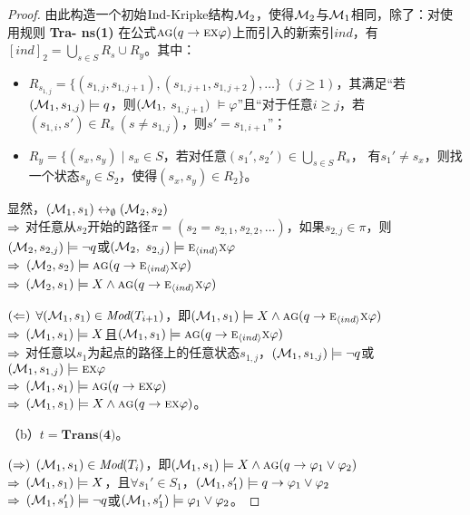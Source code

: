 \begin{proof}
	由此构造一个初始$\textrm{Ind}$-Kripke结构${\cal M}_2$，使得${\cal M}_2$与${\cal M}_1$相同，除了：对使用规则 \textbf{Tra- ns(1)} 在公式$\textsc{a}\textsc{g}(q \rightarrow \textsc{e} \textsc{x} \varphi)$上而引入的新索引$ind$，有$[ind]_2=\bigcup_{s\in S} R_s \cup R_y$。其中：
	\begin{itemize}
		\item $R_{s_{1,j}}=\{(s_{1,j}, s_{1,j+1}), (s_{1,j+1}, s_{1,j+2}),\dots\}$ $(j\geq 1)$，其满足“若$({\cal M}_1,s_{1,j}) \models q$，则$({\cal M}_1,$ $s_{1,j+1})$ $\models \varphi$”且“对于任意$i\geq j$，若$(s_{1,i}, s') \in R_s\ (s \not= s_{1,j})$，则$s'=s_{1,i+1}$”；
		\item $R_y=\{(s_x,s_y)\mid s_x\in S$，若对任意$(s_1',s_2') \in \bigcup_{s\in S} R_s$， 有$s_1'\not= s_x$，则找一个状态$s_y\in S_2$，使得$(s_x,s_y)\in R_2\}$。
	\end{itemize}
	
	显然，$({\cal M}_1,s_1) \leftrightarrow_{\emptyset} ({\cal M}_2,s_2)$\\
	$\Rightarrow$ 对任意从$s_2$开始的路径$\pi=( s_2= s_{2,1} , s_{2,2}, \dots)$，如果$s_{2,j} \in \pi$，则$({\cal M}_2,s_{2,j}) \models \neg q$或$({\cal M}_2,$ $s_{2,j})\models \textsc{e}_{{\langle{ind}\rangle}} \textsc{x} \varphi$\\
	$\Rightarrow$ $({\cal M}_2,s_2)\models \textsc{a}\textsc{g}(q \rightarrow \textsc{e}_{{\langle{ind}\rangle}} \textsc{x} \varphi)$\\
	$\Rightarrow$ $({\cal M}_2,s_1) \models X \wedge \textsc{a}\textsc{g}(q \rightarrow \textsc{e}_{{\langle{ind}\rangle}} \textsc{x} \varphi)$
	
	$(\Leftarrow)$ $\forall ({\cal M}_1,s_1) \in \textit{Mod}(T_{i+1})$，即$({\cal M}_1,s_1) \models X \wedge \textsc{a} \textsc{g}(q \rightarrow \textsc{e}_{{\langle{ind}\rangle}} \textsc{x} \varphi )$\\
	$\Rightarrow$ $({\cal M}_1,s_1) \models X$且$({\cal M}_1,s_1) \models \textsc{a} \textsc{g}(q \rightarrow \textsc{e}_{{\langle{ind}\rangle}} \textsc{x} \varphi)$\\
	$\Rightarrow$ 对任意以$s_1$为起点的路径上的任意状态$s_{1,j}$，$({\cal M}_1,s_{1,j}) \models \neg q$或$({\cal M}_1,s_{1,j}) \models \textsc{e}\textsc{x}\varphi$\\
	$\Rightarrow$ $({\cal M}_1,s_1) \models \textsc{a}\textsc{g}(q \rightarrow \textsc{e} \textsc{x} \varphi)$\\
	$\Rightarrow$ $({\cal M}_1,s_1) \models X \wedge \textsc{a}\textsc{g}(q \rightarrow \textsc{e} \textsc{x} \varphi)$。
	
	（b）$t=\textbf{Trans(4)}$。
	
	$(\Rightarrow)$	$({\cal M}_1,s_1) \in \textit{Mod}(T_i)$，即$({\cal M}_1,s_1) \models X \wedge \textsc{a}\textsc{g} (q \rightarrow \varphi_1 \vee \varphi_2)$ \\
	$\Rightarrow$ $({\cal M}_1,s_1) \models X$，且$\forall s_1'\in S_1$，$({\cal M}_1, s_1') \models q \rightarrow \varphi_1 \vee \varphi_2$\\
	$\Rightarrow$ $({\cal M}_1,s_1')\models \neg q$或$({\cal M}_1,s_1')\models \varphi_1 \vee \varphi_2$。
	

\end{proof}
